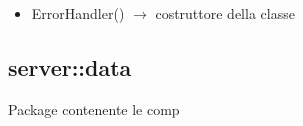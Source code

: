 \begin{description}
\begin{itemize}
	\item ErrorHandler() $\rightarrow$ costruttore della classe
\end{itemize}

\end{description}

\vspace{0.5cm}
\subsection{server::data}
Package contenente le comp